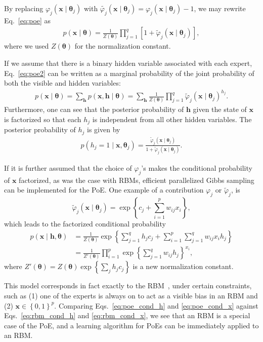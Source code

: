 \documentclass{now}
\newcommand{\vect}[1]{\mathbf{#1}}
\newcommand{\vects}[1]{\boldsymbol{#1}}
\newcommand{\vh}[0]{\vect{h}}
\newcommand{\vx}[0]{\vect{x}}
\newcommand{\TT}[0]{{\vects{\theta}}}
\begin{document}
By replacing $\varphi_j(\vx \mid \TT_j)$ with $\tilde{\varphi_j}(\vx \mid
\TT_j)=\varphi_j(\vx\mid\TT_j)-1$, we may rewrite Eq.~\eqref{eq:poe} as
\begin{align}
    \label{eq:poe2}
    p(\vx \mid \TT) = \frac{1}{Z(\TT)}\prod_{j=1}^q \left[ 1 +
    \tilde{\varphi}_j(\vx \mid
    \TT_j)\right],
\end{align}
where we used $Z(\TT)$ for the normalization constant. 

If we assume that there is a binary hidden variable associated with each expert,
Eq.~\eqref{eq:poe2} can be written as a marginal probability of the joint
probability of both the visible and hidden variables:
\begin{align}
    \label{eq:poe2_joint}
    p(\vx \mid \TT) = \sum_{\vh} p(\vx, \vh \mid \TT) =
    \sum_{\vh} \frac{1}{Z(\TT)} \prod_{j=1}^q
    \tilde{\varphi}_j (\vx \mid \TT_j)^{h_j}.
\end{align}
Furthermore, one can see that the posterior probability of $\vh$ given the state
of $\vx$ is factorized so that each $h_j$ is independent from all other hidden
variables. The posterior probability of $h_j$ is given by
\begin{align}
    \label{eq:poe_cond_h}
    p(h_j = 1 \mid \vx, \TT_j) = \frac{\tilde{\varphi}_j(\vx
    \mid \TT_j)}{1 + \tilde{\varphi}_j(\vx \mid \TT_j)}.
\end{align}

If it is further assumed that the choice of $\varphi_j$'s makes the conditional
probability of $\vx$ factorized, as was the case with RBMs, efficient
parallelized Gibbs sampling can be implemented for the PoE.  One example of a
contribution $\varphi_j$ or
$\tilde{\varphi}_j$, is 
\[
\tilde{\varphi}_j(\vx \mid \TT_j) = \exp\left\{ c_j +
\sum_{i=1}^p w_{ij} x_i \right\},
\]
which leads to the factorized conditional probability
\begin{align}
    \label{eq:poe_cond_x}
p(\vx \mid \vh, \TT) &= \frac{1}{Z(\TT)} \exp\left\{
\sum_{j=1}^q h_j c_j + \sum_{i=1}^p \sum_{j=1}^q w_{ij} x_i
h_j \right\} 
\nonumber \\
&= \frac{1}{Z'(\TT)} \prod_{i=1}^p \exp\left\{
\sum_{j=1}^q w_{ij} h_j
\right\}^{x_i},
\end{align}
where $Z'(\TT) = Z(\TT) \exp\left\{ \sum_j h_j c_j \right\}$ is a new
normalization constant.

This model corresponds in fact exactly to the RBM~\citep{Freund1994}, under
certain constraints, such as (1) one of the experts is always on to act as a
visible bias in an RBM and (2) $\vx \in \left\{ 0, 1 \right\}^p$. Comparing
Eqs.~\eqref{eq:poe_cond_h} and \eqref{eq:poe_cond_x} against
Eqs.~\eqref{eq:rbm_cond_h} and \eqref{eq:rbm_cond_x}, we see that an RBM is a
special case of the PoE, and a learning algorithm for PoEs can be immediately
applied to an RBM.
\end{document}
